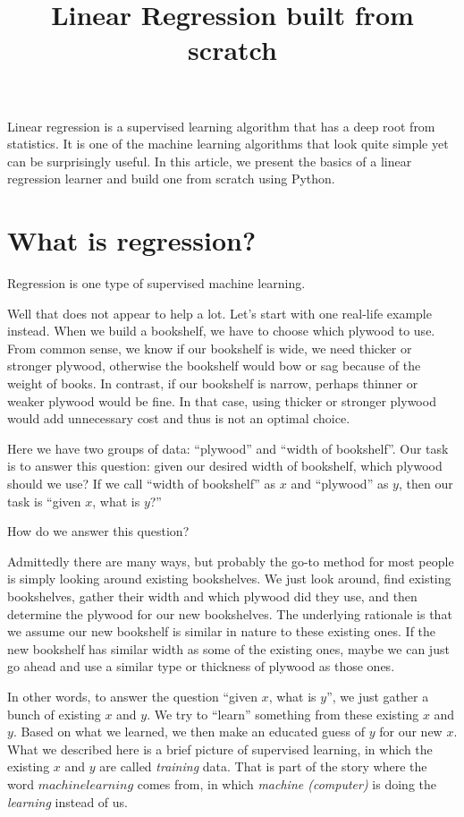 \documentclass[
	letterpaper
]{article}
\title{Linear Regression built from scratch}
\date{}
\begin{document}
\maketitle
Linear regression is a supervised learning algorithm that has a deep root from statistics. 
It is one of the machine learning algorithms that look quite simple yet can be surprisingly useful.
In this article, we present the basics of a linear regression learner and build one from scratch using Python.

\section{What is regression?}
Regression is one type of supervised machine learning.

Well that does not appear to help a lot.
Let's start with one real-life example instead.
When we build a bookshelf, we have to choose which plywood to use.
From common sense, we know if our bookshelf is wide, we need thicker or stronger plywood, otherwise the bookshelf would bow or sag because of the weight of books.
In contrast, if our bookshelf is narrow, perhaps thinner or weaker plywood would be fine.
In that case, using thicker or stronger plywood would add unnecessary cost and thus is not an optimal choice.

Here we have two groups of data: ``plywood'' and ``width of bookshelf''.
Our task is to answer this question: given our desired width of bookshelf, which plywood should we use?
If we call ``width of bookshelf'' as $x$ and ``plywood'' as $y$, then our task is ``given $x$, what is $y$?''

How do we answer this question? 

Admittedly there are many ways, but probably the go-to method for most people is simply looking around existing bookshelves.
We just look around, find existing bookshelves, gather their width and which plywood did they use, and then determine the plywood for our new bookshelves.
The underlying rationale is that we assume our new bookshelf is similar in nature to these existing ones. 
If the new bookshelf has similar width as some of the existing ones, maybe we can just go ahead and use a similar type or thickness of plywood as those ones.

In other words, to answer the question ``given $x$, what is $y$'', we just gather a bunch of existing $x$ and $y$.
We try to ``learn'' something from these existing $x$ and $y$.
Based on what we learned, we then make an educated guess of $y$ for our new $x$.
What we described here is a brief picture of supervised learning, in which the existing $x$ and $y$ are called \textit{training} data.
That is part of the story where the word $machine learning$ comes from, in which \textit{machine (computer)} is doing the \textit{learning} instead of us.
\end{document}
